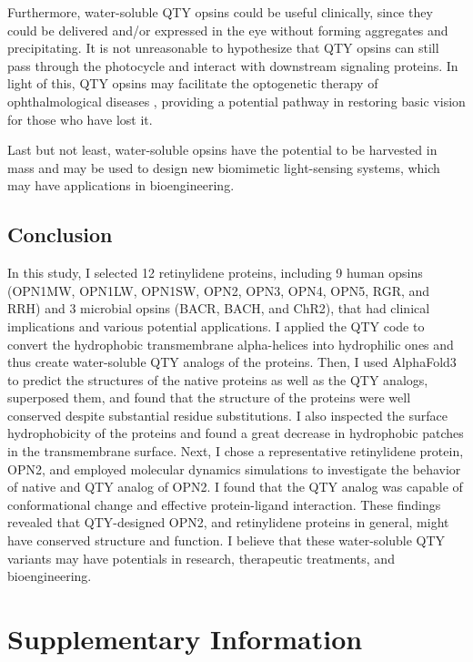 \documentclass[fleqn, 10pt]{manuscript}
\begin{document}
Furthermore, water-soluble QTY opsins could be useful clinically, since they could be delivered and/or expressed in the eye without forming aggregates and precipitating. It is not unreasonable to hypothesize that QTY opsins can still pass through the photocycle and interact with downstream signaling proteins. In light of this, QTY opsins may facilitate the optogenetic therapy of ophthalmological diseases \citep{Sakai_2022}, providing a potential pathway in restoring basic vision for those who have lost it. 

Last but not least, water-soluble opsins have the potential to be harvested in mass and may be used to design new biomimetic light-sensing systems, which may have applications in bioengineering. 

\subsection*{Conclusion}

In this study, I selected 12 retinylidene proteins, including 9 human opsins (OPN1MW, OPN1LW, OPN1SW, OPN2, OPN3, OPN4, OPN5, RGR, and RRH) and 3 microbial opsins (BACR, BACH, and ChR2), that had clinical implications and various potential applications. I applied the QTY code to convert the hydrophobic transmembrane alpha-helices into hydrophilic ones and thus create water-soluble QTY analogs of the proteins. Then, I used AlphaFold3 to predict the structures of the native proteins as well as the QTY analogs, superposed them, and found that the structure of the proteins were well conserved despite substantial residue substitutions. I also inspected the surface hydrophobicity of the proteins and found a great decrease in hydrophobic patches in the transmembrane surface. Next, I chose a representative retinylidene protein, OPN2, and employed molecular dynamics simulations to investigate the behavior of native and QTY analog of OPN2. I found that the QTY analog was capable of conformational change and effective protein-ligand interaction. These findings revealed that QTY-designed OPN2, and retinylidene proteins in general, might have conserved structure and function. I believe that these water-soluble QTY variants may have potentials in research, therapeutic treatments, and bioengineering. 


\section*{Supplementary Information} 
\end{document}
